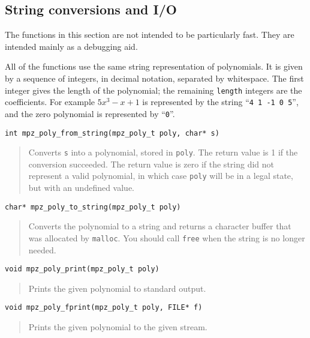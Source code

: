 \documentclass[a4paper,10pt]{article}
\newcommand{\code}{\lstinline}
\begin{document}
\subsection{String conversions and I/O}

The functions in this section are not intended to be particularly fast. They are intended mainly as a debugging aid.

All of the functions use the same string representation of polynomials. It is given by a sequence of integers, in decimal notation, separated by whitespace. The first integer gives the length of the polynomial; the remaining \code{length} integers are the coefficients. For example $5x^3 - x + 1$ is represented by the string ``\code{4 1 -1 0 5}'', and the zero polynomial is represented by ``\code{0}''.

\begin{lstlisting}
int mpz_poly_from_string(mpz_poly_t poly, char* s)
\end{lstlisting}
\begin{quote}
Converts \code{s} into a polynomial, stored in \code{poly}. The return value is 1 if the conversion succeeded. The return value is zero if the string did not represent a valid polynomial, in which case \code{poly} will be in a legal state, but with an undefined value.
\end{quote}

\begin{lstlisting}
char* mpz_poly_to_string(mpz_poly_t poly)
\end{lstlisting}
\begin{quote}
Converts the polynomial to a string and returns a character buffer that was allocated by \code{malloc}. You should call \code{free} when the string is no longer needed.
\end{quote}

\begin{lstlisting}
void mpz_poly_print(mpz_poly_t poly)
\end{lstlisting}
\begin{quote}
Prints the given polynomial to standard output.
\end{quote}

\begin{lstlisting}
void mpz_poly_fprint(mpz_poly_t poly, FILE* f)
\end{lstlisting}
\begin{quote}
Prints the given polynomial to the given stream.
\end{quote}
\end{document}

